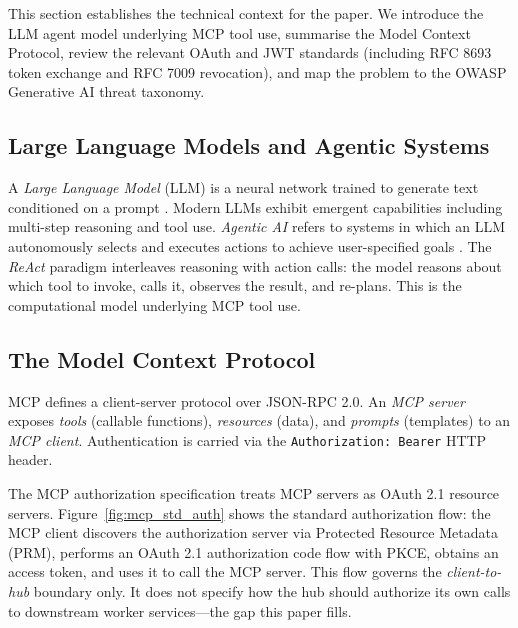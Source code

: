 \documentclass[journal]{IEEEtran}
\begin{document}
This section establishes the technical context for the paper. We introduce the
LLM agent model underlying MCP tool use, summarise the Model Context Protocol,
review the relevant OAuth and JWT standards (including RFC 8693 token exchange
and RFC 7009 revocation), and map the problem to the OWASP Generative AI threat
taxonomy.

\subsection{Large Language Models and Agentic Systems}

A \textit{Large Language Model} (LLM) is a neural network trained to generate
text conditioned on a prompt \cite{vaswani2017}. Modern LLMs exhibit emergent
capabilities including multi-step reasoning and tool use. \textit{Agentic AI}
refers to systems in which an LLM autonomously selects and executes actions to
achieve user-specified goals \cite{wang2024survey}. The \textit{ReAct} paradigm
\cite{yao2022react} interleaves reasoning with action calls: the model reasons
about which tool to invoke, calls it, observes the result, and re-plans. This
is the computational model underlying MCP tool use.

\subsection{The Model Context Protocol}

MCP \cite{mcp_spec} defines a client-server protocol over JSON-RPC 2.0. An
\textit{MCP server} exposes \textit{tools} (callable functions), \textit{resources}
(data), and \textit{prompts} (templates) to an \textit{MCP client}. Authentication
is carried via the \texttt{Authorization: Bearer} HTTP header.

The MCP authorization specification \cite{mcp_spec_2025} treats MCP servers as
OAuth 2.1 resource servers. Figure~\ref{fig:mcp_std_auth} shows the standard
authorization flow: the MCP client discovers the authorization server via
Protected Resource Metadata (PRM), performs an OAuth 2.1 authorization code flow
with PKCE, obtains an access token, and uses it to call the MCP server. This flow
governs the \textit{client-to-hub} boundary only. It does not specify how the hub
should authorize its own calls to downstream worker services---the gap this paper
fills.
\end{document}
